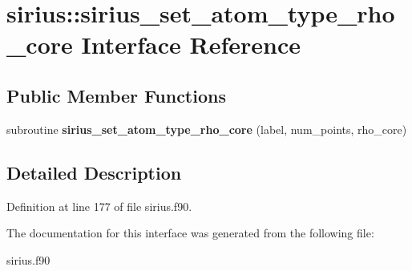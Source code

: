 \hypertarget{interfacesirius_1_1sirius__set__atom__type__rho__core}{}\section{sirius\+:\+:sirius\+\_\+set\+\_\+atom\+\_\+type\+\_\+rho\+\_\+core Interface Reference}
\label{interfacesirius_1_1sirius__set__atom__type__rho__core}
\subsection*{Public Member Functions}
\begin{DoxyCompactItemize}
\item 
\hypertarget{interfacesirius_1_1sirius__set__atom__type__rho__core_a16cff7f0ce9734104b1c31d35b62b7d4}{}subroutine {\bfseries sirius\+\_\+set\+\_\+atom\+\_\+type\+\_\+rho\+\_\+core} (label, num\+\_\+points, rho\+\_\+core)\label{interfacesirius_1_1sirius__set__atom__type__rho__core_a16cff7f0ce9734104b1c31d35b62b7d4}

\end{DoxyCompactItemize}


\subsection{Detailed Description}


Definition at line 177 of file sirius.\+f90.



The documentation for this interface was generated from the following file\+:\begin{DoxyCompactItemize}
\item 
sirius.\+f90\end{DoxyCompactItemize}
